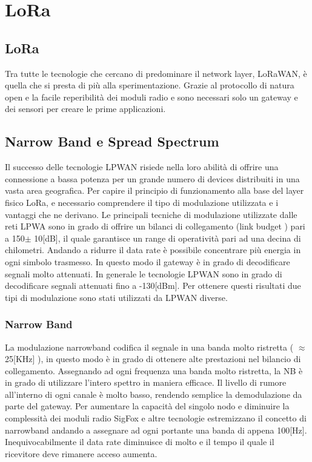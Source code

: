 \chapter{LoRa}
\section{LoRa}
Tra tutte le tecnologie che cercano di predominare il network layer, LoRaWAN, è
quella che si presta di più alla sperimentazione.
Grazie al protocollo di natura open e la facile reperibilità dei moduli radio e  
sono necessari solo un gateway e dei sensori per creare le prime applicazioni.

\section{Narrow Band e Spread Spectrum}
Il successo delle tecnologie LPWAN risiede nella loro abilità di offrire una
connessione a bassa potenza per un grande numero di devices distribuiti in una
vasta area geografica. Per capire il principio di funzionamento alla base del
layer fisico LoRa, e necessario comprendere il tipo di modulazione utilizzata e
i vantaggi che ne derivano.
Le principali tecniche di modulazione utilizzate dalle reti LPWA sono in grado
di offrire un bilanci di collegamento (link budget ) pari a 150$\pm$ 10[dB], il quale
garantisce un range di operatività pari ad una decina di chilometri.
Andando a ridurre il data rate è possibile concentrare più energia in ogni
simbolo trasmesso. In questo modo il gateway è in grado di decodificare segnali
molto attenuati. In generale le tecnologie LPWAN sono in grado di decodificare
segnali attenuati fino a -130[dBm]. Per ottenere questi risultati due tipi di
modulazione sono stati utilizzati da LPWAN diverse.

\subsection{Narrow Band}
La modulazione narrowband codifica il segnale in una banda molto ristretta (
 $\approx$25[KHz] ), in questo modo è in grado di ottenere alte prestazioni nel
bilancio di collegamento. Assegnando ad ogni frequenza una banda molto
ristretta, la NB è in grado di utilizzare l'intero spettro in maniera efficace.
Il livello di rumore all'interno di ogni canale  è molto basso, rendendo semplice la demodulazione da parte del gateway.
Per aumentare la capacità del singolo nodo e diminuire la complessità dei moduli
radio SigFox e altre tecnologie  estremizzano il concetto di narrowband andando a assegnare ad
ogni portante una banda di appena 100[Hz]. Inequivocabilmente il data rate
diminuisce di molto e il tempo il quale il ricevitore deve rimanere acceso
aumenta. 

